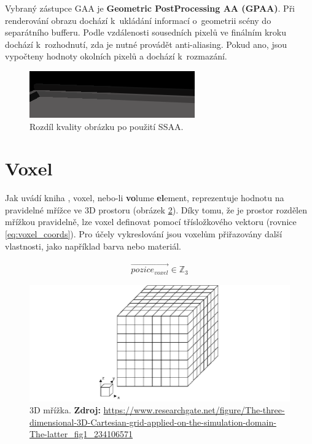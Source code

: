 Vybraný zástupce GAA je \textbf{Geometric PostProcessing AA (GPAA)}. Při renderování obrazu dochází k~ukládání informací o~geometrii scény do separátního bufferu. Podle vzdálenosti sousedních pixelů ve finálním kroku dochází k~rozhodnutí, zda je nutné provádět anti-aliasing. Pokud ano, jsou vypočteny hodnoty okolních pixelů a dochází k~rozmazání.

\begin{figure}[H]
	\centering
	\includegraphics[scale=3]{obrazky-figures/ssaa_diff.png}
	\caption{Rozdíl kvality obrázku po použití SSAA.}
	\label{fig:aliasing}
\end{figure}




\section{Voxel} \label{voxels}
Jak uvádí kniha \cite{gfx_principles_practice}, voxel, nebo-li \textbf{vo}lume \textbf{el}ement, reprezentuje hodnotu na pravidelné mřížce ve 3D prostoru (obrázek \ref{fig:3d_grid}). Díky tomu, že je prostor rozdělen mřížkou pravidelně, lze voxel definovat pomocí třísložkového vektoru (rovnice \ref{eq:voxel_coords}). Pro účely vykreslování jsou voxelům přiřazovány další vlastnosti, jako například barva nebo materiál.

\begin{equation} \label{eq:voxel_coords}
	\begin{gathered}
		\vec{pozice_{voxel}} \in \mathbb{Z}_3
	\end{gathered}
\end{equation}

\begin{figure}[H]
	\centering
	\includegraphics[scale=0.5]{obrazky-figures/3d_grid.png}
	\caption{3D mřížka. \textbf{Zdroj: }\url{https://www.researchgate.net/figure/The-three-dimensional-3D-Cartesian-grid-applied-on-the-simulation-domain-The-latter_fig1_234106571}}
	\label{fig:3d_grid}
\end{figure}

